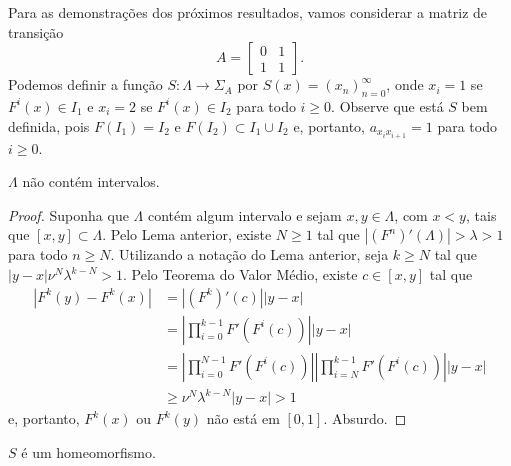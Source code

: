 Para as demonstrações dos próximos resultados, vamos considerar a matriz de transição
$$A = \begin{bmatrix}
0 & 1 \\
1 & 1
\end{bmatrix}.$$
Podemos definir a função $S: \Lambda \to \Sigma_A$ por $S(x) = (x_n)_{n=0}^\infty$, onde $x_i = 1$ se $F^i(x) \in I_1$ e $x_i = 2$ se $F^i(x) \in I_2$ para todo $i \geq 0$. Observe que está $S$ bem definida, pois $F(I_1) = I_2$ e $F(I_2) \subset I_1 \cup I_2$ e, portanto, $a_{x_i x_{i+1}} = 1$ para todo $i \geq 0$. 

\begin{lemma}
$\Lambda$ não contém intervalos.
\end{lemma}

\begin{proof}
Suponha que $\Lambda$ contém algum intervalo e sejam $x, y \in \Lambda$, com $x < y$, tais que $[x, y] \subset \Lambda$. Pelo Lema anterior, existe $N \geq 1$ tal que $|(F^n)'(\Lambda)| > \lambda > 1$ para todo $n \geq N$. Utilizando a notação do Lema anterior, seja $k \geq N$ tal que $|y - x| \nu^N \lambda^{k - N} > 1$. Pelo Teorema do Valor Médio, existe $c \in [x, y]$ tal que
\begin{align*}
|F^k(y) - F^k(x)| & = |(F^k)'(c)||y-x| \\
& = \left| \prod_{i=0}^{k-1} F'(F^i(c)) \right| |y-x| \\ 
& = \left| \prod_{i=0}^{N-1} F'(F^i(c)) \right| \left| \prod_{i=N}^{k-1} F'(F^i(c)) \right| |y-x| \\
& \geq \nu^N \lambda^{k-N} |y-x| > 1
\end{align*}
e, portanto, $F^k(x)$ ou $F^k(y)$ não está em $[0,1]$. Absurdo.
\end{proof}

\begin{proposition}
$S$ é um homeomorfismo.
\end{proposition}


